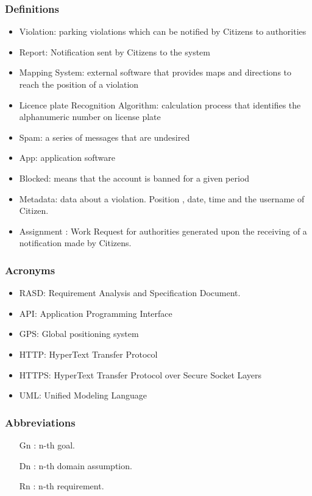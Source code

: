 \subsubsection {Definitions}
\begin{itemize}
\item	Violation: parking violations which can be notified by Citizens to authorities
\item	Report: Notification sent by Citizens to the system
\item	Mapping System: external software that provides maps and directions to reach the position of a violation
\item	Licence plate Recognition Algorithm: calculation process that identifies the alphanumeric number on license plate
\item	Spam: a series of messages that are undesired
\item	App: application software 
\item	Blocked: means that the account is banned for a given period
\item	Metadata: data about a violation. Position , date,  time and the username of Citizen. 
\item	Assignment : Work Request for authorities generated upon the receiving of a notification made by Citizens.
\end{itemize}
\subsubsection {Acronyms}
\begin{itemize}
\item	RASD: Requirement Analysis and Specification Document.
\item	API: Application Programming Interface
\item	GPS: Global positioning system
\item	HTTP: HyperText Transfer Protocol
\item	HTTPS: HyperText Transfer Protocol over Secure Socket Layers
\item	UML: Unified Modeling Language

\end{itemize}
\subsubsection {Abbreviations}
\begin{itemize}
\item	[Gn]: n-th goal.
\item	[Dn]: n-th domain assumption.
\item	[Rn]: n-th requirement.
\end{itemize}

